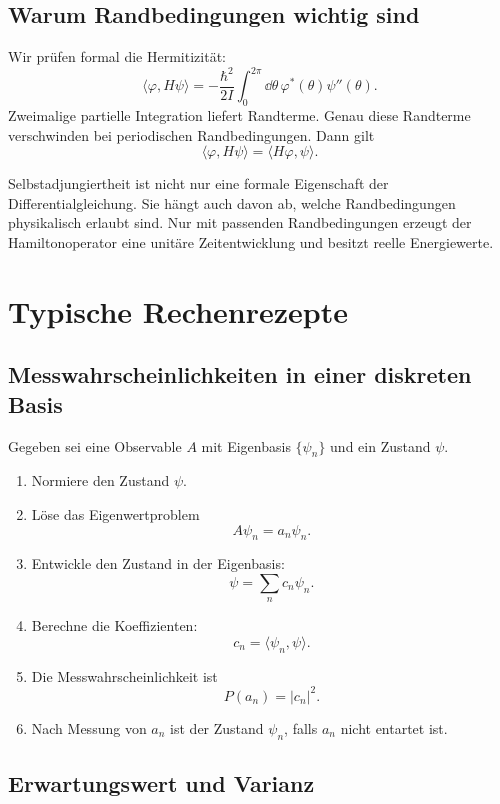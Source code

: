 \subsection{Warum Randbedingungen wichtig sind}

Wir prüfen formal die Hermitizität:
\[
    \langle\varphi,H\psi\rangle
    =-\frac{\hbar^2}{2I}\int_0^{2\pi}\dd\theta\,\varphi^*(\theta)\psi''(\theta).
\]
Zweimalige partielle Integration liefert Randterme. Genau diese Randterme verschwinden bei periodischen Randbedingungen. Dann gilt
\[
    \langle\varphi,H\psi\rangle=\langle H\varphi,\psi\rangle.
\]

\begin{conceptbox}
Selbstadjungiertheit ist nicht nur eine formale Eigenschaft der Differentialgleichung. Sie hängt auch davon ab, welche Randbedingungen physikalisch erlaubt sind. Nur mit passenden Randbedingungen erzeugt der Hamiltonoperator eine unitäre Zeitentwicklung und besitzt reelle Energiewerte.
\end{conceptbox}

\section{Typische Rechenrezepte}

\subsection{Messwahrscheinlichkeiten in einer diskreten Basis}

Gegeben sei eine Observable $A$ mit Eigenbasis $\{\psi_n\}$ und ein Zustand $\psi$.

\begin{enumerate}
    \item Normiere den Zustand $\psi$.
    \item Löse das Eigenwertproblem
    \[
        A\psi_n=a_n\psi_n.
    \]
    \item Entwickle den Zustand in der Eigenbasis:
    \[
        \psi=\sum_n c_n\psi_n.
    \]
    \item Berechne die Koeffizienten:
    \[
        c_n=\langle\psi_n,\psi\rangle.
    \]
    \item Die Messwahrscheinlichkeit ist
    \[
        P(a_n)=|c_n|^2.
    \]
    \item Nach Messung von $a_n$ ist der Zustand $\psi_n$, falls $a_n$ nicht entartet ist.
\end{enumerate}

\subsection{Erwartungswert und Varianz}

